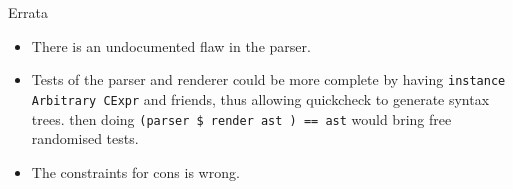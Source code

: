 \documentclass{beamer}
\begin{document}
\begin{frame}{Errata}
\begin{itemize}
  \item There is an undocumented flaw in the parser.
  \item Tests of the parser and renderer could be more complete by having
  \texttt{instance Arbitrary CExpr} and friends, thus allowing quickcheck to generate syntax
  trees. then doing \texttt{(parser \$ render ast ) == ast} would bring free
  randomised tests.
  \item The constraints for cons is wrong.
\end{itemize}
\end{frame}
\end{document}
